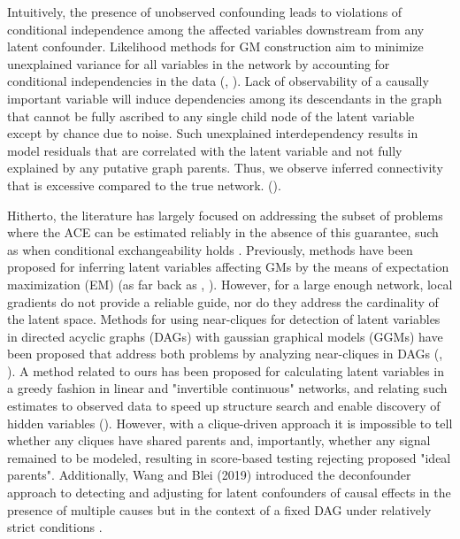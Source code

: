 \documentclass[letterpaper]{article}
\begin{document}
Intuitively, the presence of unobserved confounding leads to violations of conditional independence among the affected variables downstream from any latent confounder.  Likelihood methods for GM construction aim to minimize unexplained variance for all variables in the network by accounting for conditional independencies in the data (\cite{pearl_causality:_2000}, \cite{friedman_being_2013}).  Lack of observability of a causally important variable will induce dependencies among its descendants in the graph that cannot be fully ascribed to any single child node of the latent variable except by chance due to noise.  Such unexplained interdependency results in model residuals that are correlated with the latent variable and not fully explained by any putative graph parents. Thus, we observe inferred connectivity that is excessive compared to the true network.  (\cite{elidan_discovering_2001}).  


Hitherto, the literature has largely focused on addressing the subset of problems where the ACE can be estimated reliably in the absence of this guarantee, such as when conditional exchangeability holds \cite{hernan_estimating_2006}.  Previously, methods have been proposed for inferring latent variables affecting GMs by the means of expectation maximization (EM) (as far back as \cite{friedman1997learning}, \cite{friedman1998bayesian}).  However, for a large enough network, local gradients do not provide a reliable guide, nor do they address the cardinality of the latent space.  Methods for using near-cliques for detection of latent variables in directed acyclic graphs (DAGs) with gaussian graphical models (GGMs) have been proposed that address both problems by analyzing near-cliques in DAGs (\cite{elidan_discovering_2001}, \cite{silva_learning_2006}).  A method related to ours has been proposed for calculating latent variables in a greedy fashion in linear and "invertible continuous" networks, and relating such estimates to observed data to speed up structure search and enable discovery of hidden variables (\cite{elidan_ideal_2007}). However, with a clique-driven approach it is impossible to tell whether any cliques have shared parents and, importantly, whether any signal remained to be modeled, resulting in score-based testing rejecting proposed "ideal parents". Additionally, Wang and Blei (2019) introduced the deconfounder approach to detecting and adjusting for latent confounders of causal effects in the presence of multiple causes but in the context of a fixed DAG under relatively strict conditions \cite{wang_deconfounder_2019}. 
\end{document}
